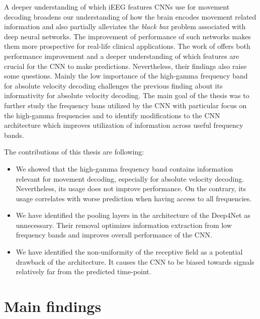 


A deeper understanding of which iEEG features CNNs use for movement decoding broadens our understanding of how the brain encodes movement related information and also partially alleviates the \textit{black box} problem associated with deep neural networks.
The improvement of performance of such networks makes them more prospective for real-life clinical applications.
The work of \cite{Hammer-2021} offers both performance improvement and a deeper understanding of which features are crucial for the CNN to make predictions.
Nevertheless, their findings also raise some questions.
Mainly the low importance of the high-gamma frequency band for absolute velocity decoding challenges the previous finding about its informativity for absolute velocity decoding.
The main goal of the thesis was to further study the frequency bans utilized by the CNN with particular focus on the high-gamma frequencies and to identify modifications to the CNN architecture which improves utilization of information across useful frequency bands. 

The contributions of this thesis are following:
\begin{itemize}
    \item We showed that the high-gamma frequency band contains information relevant for movement decoding, especially for absolute velocity decoding. Nevertheless, its usage does not improve performance. On the contrary, its usage correlates with worse prediction when having access to all frequencies.
    \item We have identified the pooling layers in the architecture of the Deep4Net as unnecessary. Their removal optimizes information extraction from low frequency bands and improves overall performance of the CNN.
    \item We have identified the non-uniformity of the receptive field as a potential drawback of the architecture. It causes the CNN to be biased towards signals relatively far from the predicted time-point.
\end{itemize}


\section*{Main findings}

